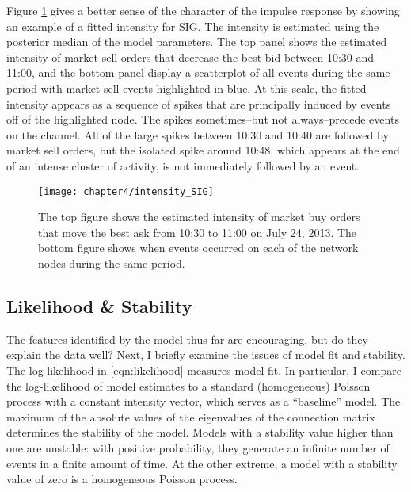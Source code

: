 		Figure \ref{fig:intensity_SIG} gives a better sense of the character of the impulse response by showing an example of a fitted intensity for SIG. The intensity is estimated using the posterior median of the model parameters. The top panel shows the estimated intensity of market sell orders that decrease the best bid between 10:30 and 11:00, and the bottom panel display a scatterplot of all events during the same period with market sell events highlighted in blue. At this scale, the fitted intensity appears as a sequence of spikes that are principally induced by events off of the highlighted node. The spikes sometimes--but not always--precede events on the channel. All of the large spikes between 10:30 and 10:40 are followed by market sell orders, but the isolated spike around 10:48, which appears at the end of an intense cluster of activity, is not immediately followed by an event.

		\begin{figure}[p]
			\small
			\linespread{1}
			\centering
			\texttt{[image: chapter4/intensity\_SIG]}
			\captionsetup{skip=-20pt, labelsep=colon, font=footnotesize, width=\linewidth}
			\caption[Fitted intensity: SIG]{The top figure shows the estimated intensity of market buy orders that move the best ask from 10:30 to 11:00 on July 24, 2013. The bottom figure shows when events occurred on each of the network nodes during the same period.}
			\label{fig:intensity_SIG}
		\end{figure}

	\subsection{Likelihood \& Stability}
		The features identified by the model thus far are encouraging, but do they explain the data well? Next, I briefly examine the issues of model fit and stability. The log-likelihood in \eqref{eqn:likelihood} measures model fit. In particular, I compare the log-likelihood of model estimates to a standard (homogeneous) Poisson process with a constant intensity vector, which serves as a “baseline” model. The maximum of the absolute values of the eigenvalues of the connection matrix determines the stability of the model. Models with a stability value higher than one are unstable: with positive probability, they generate an infinite number of events in a finite amount of time. At the other extreme, a model with a stability value of zero is a homogeneous Poisson process.

